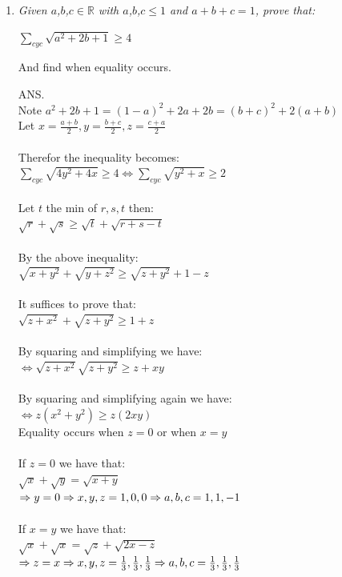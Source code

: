 \documentclass{article}
\begin{document}
\begin{enumerate}
\medskip
\item %
{\itshape 
Given $a$,$b$,$c\in\mathbb{R}$ with $a$,$b$,$c\leq 1$ and $a+b+c = 1$, prove that:
\begin{center}
   $\sum_{cyc} \sqrt{a^2+2b+1}\geq 4$ 
\end{center}
And find when equality occurs.}

\medskip
ANS.
\\Note $a^2 + 2b + 1 = (1-a)^2 + 2a + 2b = (b+c)^2 + 2(a+b)$
\\Let $x = \frac{a+b}{2}, y = \frac{b+c}{2}, z = \frac{c+a}{2}$\\
\\
Therefor the inequality becomes:
\\$\sum_{cyc} \sqrt{4y^2+4x}\geq 4\iff\sum_{cyc} \sqrt{y^2+x}\geq 2 $\\
\\
Let $t$ the min of ${r,s,t}$ then:
\\$\sqrt{r}+\sqrt{s}\geq \sqrt{t}+\sqrt{r+s-t}$\\
\\
By the above inequality:
\\$\sqrt{x+y^{2}}+\sqrt{y+z^{2}}\geq \sqrt{z+y^{2}}+1-z$\\
\\It suffices to prove that:
\\$\sqrt{z+x^{2}}+\sqrt{z+y^{2}}\geq 1+z$\\
\\
By squaring and simplifying we have:
\\$\iff\sqrt{z+x^{2}}\sqrt{z+y^{2}}\geq z+xy$\\
\\
By squaring and simplifying again we have:
\\$\iff z(x^2+y^2) \geq z(2xy)$\\
Equality occurs when $z = 0$ or when $x = y$\\\\
If $z = 0$ we have that:
\\$\sqrt{x}+\sqrt{y} = \sqrt{x+y}$
\\$\Rightarrow y = 0\\\Rightarrow {x,y,z} = {1,0,0}\\\Rightarrow {a,b,c} = {1,1,-1}$\\\\
If $x=y$ we have that:
\\$\sqrt{x}+\sqrt{x} = \sqrt{z} + \sqrt{2x-z}$
\\$\Rightarrow z = x\\\Rightarrow {x,y,z} = {\frac{1}{3},\frac{1}{3},\frac{1}{3}}\\\Rightarrow {a,b,c} = {\frac{1}{3},\frac{1}{3},\frac{1}{3}}$\\\\



\end{enumerate}
\end{document}
